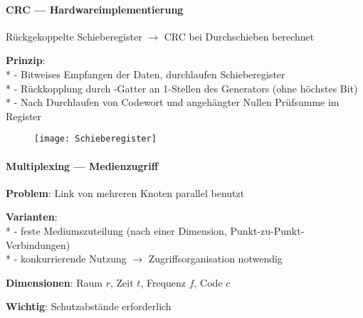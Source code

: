 
\paragraph{CRC --- Hardwareimplementierung}
\begin{items}
  \item Rückgekoppelte Schieberegister \( \to \) CRC bei Durchschieben berechnet
  \item \textbf{Prinzip}: \\*
    - Bitweises Empfangen der Daten, durchlaufen Schieberegister \\*
    - Rückkopplung durch -Gatter an 1-Stellen des Generators (ohne höchstes Bit)\\*
    - Nach Durchlaufen von Codewort und angehängter Nullen Prüfsumme im Register
\end{items}
\begin{figure}[H]\centering\label{Schieberegister}\texttt{[image: Schieberegister]}\end{figure}

\paragraph{Multiplexing --- Medienzugriff}
\begin{items}
  \item \textbf{Problem}: Link von mehreren Knoten parallel benutzt
   \item \textbf{Varianten}: \\*
  - feste Mediumszuteilung (nach einer Dimension, Punkt-zu-Punkt-Verbindungen) \\*
  - konkurrierende Nutzung \( \to \) Zugriffsorganisation notwendig
  \item \textbf{Dimensionen}: Raum \( r \), Zeit \( t \), Frequenz \( f \), Code \( c \)
  \item \textbf{Wichtig}: Schutzabstände erforderlich
\end{items}

